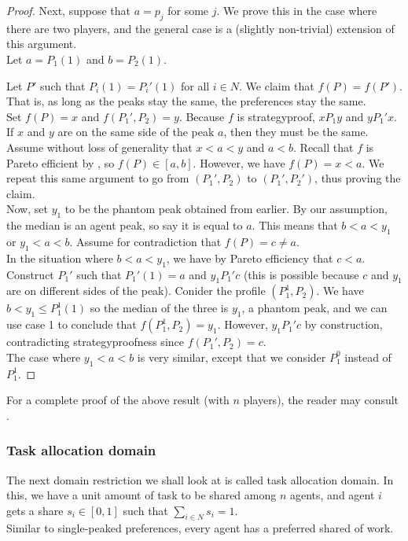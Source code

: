 \begin{proof}
			Next, suppose that $a = p_j$ for some $j$. We prove this in the case where there are two players, and the general case is a (slightly non-trivial) extension of this argument.\\
			Let $a = P_1(1)$ and $b = P_2(1)$. 

			Let $P'$ such that $P_i(1) = P_i'(1)$ for all $i \in N$. We claim that $f(P) = f(P')$. That is, as long as the peaks stay the same, the preferences stay the same.\\
			Set $f(P) = x$ and $f(P_1',P_2) = y$. Because $f$ is strategyproof, $x P_1 y$ and $y P_1' x$. If $x$ and $y$ are on the same side of the peak $a$, then they must be the same.\\
			Assume without loss of generality that $x < a < y$ and $a < b$. Recall that $f$ is Pareto efficient by , so $f(P) \in [a,b]$. However, we have $f(P) = x < a$. We repeat this same argument to go from $(P_1',P_2)$ to $(P_1',P_2')$, thus proving the claim.\\
			
			Now, set $y_1$ to be the phantom peak obtained from earlier. By our assumption, the median is an agent peak, so say it is equal to $a$. This means that $b < a < y_1$ or $y_1 < a < b$. Assume for contradiction that $f(P) = c \ne a$.\\
			In the situation where $b < a < y_1$, we have by Pareto efficiency that $c < a$. Construct $P_1'$ such that $P_1'(1) = a$ and $y_1 P_1' c$ (this is possible because $c$ and $y_1$ are on different sides of the peak). Conider the profile $(P_1^1,P_2)$. We have $b < y_1 \le P_1^1(1)$ so the median of the three is $y_1$, a phantom peak, and we can use case 1 to conclude that $f(P_1^1,P_2) = y_1$. However, $y_1 P_1' c$ by construction, contradicting strategyproofness since $f(P_1',P_2) = c$.\\
			The case where $y_1 < a < b$ is very similar, except that we consider $P_1^0$ instead of $P_1^1$.
		\end{proof}

		For a complete proof of the above result (with $n$ players), the reader may consult \cite{moulin-singlepeak}.

	\subsubsection{Task allocation domain}

		The next domain restriction we shall look at is called task allocation domain. In this, we have a unit amount of task to be shared among $n$ agents, and agent $i$ gets a share $s_i \in [0,1]$ such that $\sum_{i \in N} s_i = 1$.\\
		Similar to single-peaked preferences, every agent has a preferred shared of work. 

